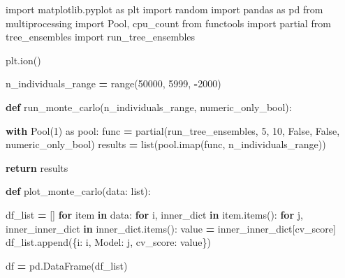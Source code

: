 \documentclass[
]{book}
\newenvironment{Shaded}{\begin{snugshade}}{\end{snugshade}}
\newcommand{\BuiltInTok}[1]{#1}
\newcommand{\ControlFlowTok}[1]{\textcolor[rgb]{0.13,0.29,0.53}{\textbf{#1}}}
\newcommand{\DecValTok}[1]{\textcolor[rgb]{0.00,0.00,0.81}{#1}}
\newcommand{\ImportTok}[1]{#1}
\newcommand{\KeywordTok}[1]{\textcolor[rgb]{0.13,0.29,0.53}{\textbf{#1}}}
\newcommand{\NormalTok}[1]{#1}
\newcommand{\OperatorTok}[1]{\textcolor[rgb]{0.81,0.36,0.00}{\textbf{#1}}}
\newcommand{\StringTok}[1]{\textcolor[rgb]{0.31,0.60,0.02}{#1}}
\newcommand{\VariableTok}[1]{\textcolor[rgb]{0.00,0.00,0.00}{#1}}
\theoremstyle{definition}
\theoremstyle{definition}
\theoremstyle{definition}
\theoremstyle{definition}
\theoremstyle{remark}
\begin{document}
\begin{Shaded}
\begin{Highlighting}[]
\ImportTok{import}\NormalTok{ matplotlib.pyplot }\ImportTok{as}\NormalTok{ plt}
\ImportTok{import}\NormalTok{ random}
\ImportTok{import}\NormalTok{ pandas }\ImportTok{as}\NormalTok{ pd}
\ImportTok{from}\NormalTok{ multiprocessing }\ImportTok{import}\NormalTok{ Pool, cpu\_count}
\ImportTok{from}\NormalTok{ functools }\ImportTok{import}\NormalTok{ partial}
\ImportTok{from}\NormalTok{ tree\_ensembles }\ImportTok{import}\NormalTok{ run\_tree\_ensembles}

\NormalTok{plt.ion()}

\NormalTok{n\_individuals\_range }\OperatorTok{=} \BuiltInTok{range}\NormalTok{(}\DecValTok{50000}\NormalTok{, }\DecValTok{5999}\NormalTok{, }\OperatorTok{{-}}\DecValTok{2000}\NormalTok{)}


\KeywordTok{def}\NormalTok{ run\_monte\_carlo(n\_individuals\_range, numeric\_only\_bool):}

    \ControlFlowTok{with}\NormalTok{ Pool(}\DecValTok{1}\NormalTok{) }\ImportTok{as}\NormalTok{ pool:}
\NormalTok{        func }\OperatorTok{=}\NormalTok{ partial(run\_tree\_ensembles, }\DecValTok{5}\NormalTok{, }\DecValTok{10}\NormalTok{, }\VariableTok{False}\NormalTok{, }\VariableTok{False}\NormalTok{, numeric\_only\_bool)}
\NormalTok{        results }\OperatorTok{=} \BuiltInTok{list}\NormalTok{(pool.imap(func, n\_individuals\_range))}

    \ControlFlowTok{return}\NormalTok{ results}


\KeywordTok{def}\NormalTok{ plot\_monte\_carlo(data: }\BuiltInTok{list}\NormalTok{):}

\NormalTok{    df\_list }\OperatorTok{=}\NormalTok{ []}
    \ControlFlowTok{for}\NormalTok{ item }\KeywordTok{in}\NormalTok{ data:}
        \ControlFlowTok{for}\NormalTok{ i, inner\_dict }\KeywordTok{in}\NormalTok{ item.items():}
            \ControlFlowTok{for}\NormalTok{ j, inner\_inner\_dict }\KeywordTok{in}\NormalTok{ inner\_dict.items():}
\NormalTok{                value }\OperatorTok{=}\NormalTok{ inner\_inner\_dict[}\StringTok{\textquotesingle{}cv\_score\textquotesingle{}}\NormalTok{]}
\NormalTok{                df\_list.append(\{}\StringTok{\textquotesingle{}i\textquotesingle{}}\NormalTok{: i, }\StringTok{\textquotesingle{}Model\textquotesingle{}}\NormalTok{: j, }\StringTok{\textquotesingle{}cv\_score\textquotesingle{}}\NormalTok{: value\})}

\NormalTok{    df }\OperatorTok{=}\NormalTok{ pd.DataFrame(df\_list)}


\end{Highlighting}
\end{Shaded}
\end{document}
